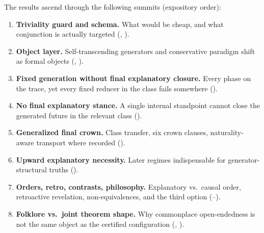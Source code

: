 \documentclass[11pt,a4paper]{article}
\theoremstyle{definition}
\begin{document}
\begin{center}
\end{center}

\medskip
\noindent
The results ascend through the following summits (expository order):
\begin{enumerate}[label=\textbf{Summit \Roman*.},leftmargin=*]
\item \textbf{Triviality guard and schema.} What would be cheap, and what conjunction is actually targeted (, ).
\item \textbf{Object layer.} Self-transcending generators and conservative paradigm shift as formal objects (, ).
\item \textbf{Fixed generation without final explanatory closure.} Every phase on the trace, yet every fixed reducer in the class fails somewhere ().
\item \textbf{No final explanatory stance.} A single internal standpoint cannot close the generated future in the relevant class ().
\item \textbf{Generalized final crown.} Class transfer, six crown clauses, naturality-aware transport where recorded ().
\item \textbf{Upward explanatory necessity.} Later regimes indispensable for generator-structural truths ().
\item \textbf{Orders, retro, contrasts, philosophy.} Explanatory vs.\ causal order, retroactive revelation, non-equivalences, and the third option (--).
\item \textbf{Folklore vs.\ joint theorem shape.} Why commonplace open-endedness is not the same object as the certified configuration (, ).
\end{enumerate}
\end{document}
